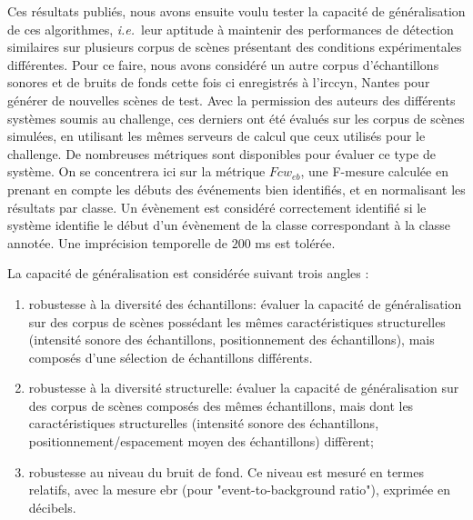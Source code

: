 Ces résultats publiés\cite{stowellhal-01253912}, nous avons ensuite voulu tester la capacité de généralisation de ces algorithmes, \textit{i.e.}~leur aptitude à maintenir des performances de détection similaires sur plusieurs corpus de scènes présentant des conditions expérimentales différentes. Pour ce faire, nous avons considéré un autre corpus d'échantillons sonores et de bruits de fonds  cette fois ci enregistrés à l'irccyn, Nantes pour générer de nouvelles scènes de test. Avec la permission des auteurs des différents systèmes soumis au challenge, ces derniers ont été évalués sur les corpus de scènes simulées, en utilisant les mêmes serveurs de calcul que ceux utilisés pour le challenge. De nombreuses métriques sont disponibles pour évaluer ce type de système. On se concentrera ici sur la métrique $Fcw_{eb}$, une F-mesure calculée en prenant en compte les débuts des événements bien identifiés, et en normalisant les résultats par classe. Un évènement est considéré correctement identifié si le système identifie le début d'un évènement de la classe correspondant à la classe annotée. Une imprécision temporelle de $200$ ms est tolérée.


La capacité de généralisation est considérée suivant trois angles :
\begin{enumerate}
  \item robustesse à la diversité des échantillons: évaluer la capacité de généralisation sur des corpus de scènes possédant les mêmes caractéristiques structurelles (intensité sonore des échantillons, positionnement des échantillons), mais composés d'une sélection de échantillons différents.
  \item robustesse à la diversité structurelle: évaluer la capacité de généralisation sur des corpus de scènes composés des mêmes échantillons, mais dont les caractéristiques structurelles (intensité sonore des échantillons, positionnement/espacement moyen des échantillons) diffèrent;
  \item robustesse au niveau du bruit de fond. Ce niveau est mesuré en termes relatifs, avec la mesure ebr (pour "event-to-background ratio"), exprimée en décibels.
\end{enumerate}


